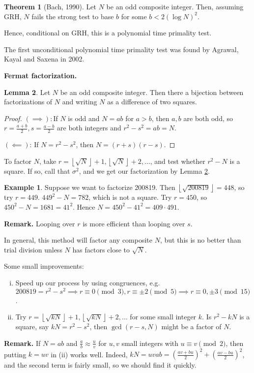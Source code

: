 \documentclass{article}
\theoremstyle{definition}
\newtheorem{theorem}{Theorem}[section]
\newtheorem{lemma}[theorem]{Lemma}
\newtheorem{example}{Example}[section]
\begin{document}
\begin{theorem}[Bach, 1990]
    Let $N$ be an odd composite integer. Then, assuming GRH, $N$ fails the strong test to base $b$ for some $b < 2(\log N)^2$.
\end{theorem}
Hence, conditional on GRH, this is a polynomial time primality test.
\vspace{1mm}

The first unconditional polynomial time primality test was found by Agrawal, Kayal and Saxena in 2002.
\vspace{1mm}

\textbf{Fermat factorization.}
\begin{lemma}\label{7.9}
    Let $N$ be an odd composite integer. Then there a bijection between factorizations of $N$ and writing $N$ as a difference of two squares.
\end{lemma}
\begin{proof}
    $(\implies): $If $N$ is odd and $N=ab$ for $a>b$, then $a,b$ are both odd, so $r=\frac{a+b}{2}, s=\frac{a-b}{2}$ are both integers and $r^2-s^2=ab=N$.
    \vspace{1mm}
    
    $(\impliedby)$: If $N=r^2-s ^2$, then $N=(r+s)(r-s)$.
\end{proof}

To factor $N$, take $r = \left\lfloor \sqrt{N} \right\rfloor+1, \left\lfloor \sqrt{N} \right\rfloor+2,\ldots$, and test whether $r^2-N$ is a square. If so, call that $\sigma ^2$, and we get our factorization by Lemma \ref{7.9}.
\begin{example}
    Suppose we want to factorize 200819. Then $\left\lfloor \sqrt{200819} \right\rfloor=448$, so try $r=449$. $449^2-N = 782$, which is not a square. Try $r=450$, so $450^2 - N = 1681 = 41^2$. Hence $N=450^2-41^2=409\cdot 491$.
\end{example}
\textbf{Remark.} Looping over $r$ is more efficient than looping over $s$.
\vspace{1mm}

In general, this method will factor any composite $N$, but this is no better than trial division unless $N$ has factors close to $\sqrt{N}$. 
\vspace{1mm}

Some small improvements:
\begin{enumerate}[(i)]
    \item Speed up our process by using congruences, e.g. $200819=r^2-s ^2 \implies r \equiv 0 \pmod{3}, r \equiv \pm 2 \pmod{5} \implies r \equiv 0,\pm 3 \pmod{15}$.
    \item Try $r=\left\lfloor \sqrt{kN} \right\rfloor+1, \left\lfloor \sqrt{kN} \right\rfloor+2,\ldots$ for some small integer $k$. Is $r^2-kN$ is a square, say $kN=r^2-s ^2$, then $\gcd(r-s,N)$ might be a factor of $N$. 
\end{enumerate}
\textbf{Remark.} If $N=ab$ and $\frac{a}{b} \approx \frac{u}{v}$ for $u,v$ small integers with $u \equiv v\pmod{2}$, then putting $k=uv$ in (ii) works well. Indeed, $kN=uvab=(\frac{av+bu}{2})^2+(\frac{av-bu}{2})^2$, and the second term is fairly small, so we should find it quickly.
\end{document}
